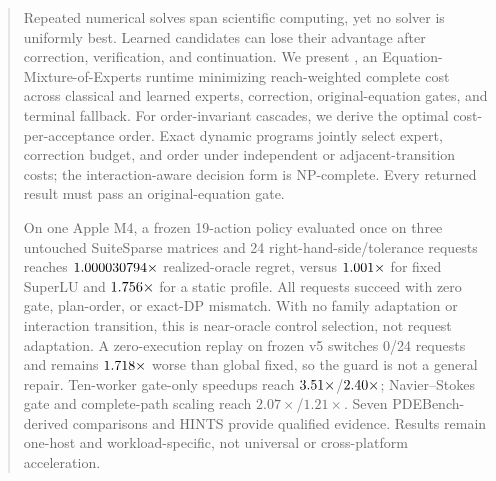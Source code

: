 \begin{abstract}
Repeated numerical solves span scientific computing, yet no solver is uniformly
best. Learned candidates can lose their advantage after correction, verification,
and continuation. We present \system, an
Equation-Mixture-of-Experts runtime minimizing reach-weighted complete cost across
classical and learned experts, correction, original-equation gates, and terminal
fallback. For order-invariant cascades, we derive the optimal cost-per-acceptance
order. Exact dynamic programs jointly select expert, correction budget, and order
under independent or adjacent-transition costs; the interaction-aware decision form
is NP-complete. Every returned result must pass an original-equation gate.

On one Apple M4, a frozen 19-action policy evaluated once on three untouched
SuiteSparse matrices and 24 right-hand-side/tolerance requests reaches
$\SuiteRouteRegretPrecise\times$ realized-oracle regret, versus
$\SuiteRouteFixedRegret\times$ for fixed SuperLU and
$\SuiteRouteStaticRegret\times$ for a static profile. All requests succeed with zero
gate, plan-order, or exact-DP mismatch. With no family adaptation or interaction
transition, this is near-oracle control selection, not request adaptation. A
zero-execution replay on frozen v5 switches 0/24 requests and
remains $\SuiteRouteVFiveReplayVsFixed\times$ worse than global fixed, so the guard
is not a general repair. Ten-worker gate-only speedups reach
$\LinearGateTenShort\times$/$\NonlinearGateTenShort\times$; Navier--Stokes gate and
complete-path scaling reach $2.07\times$/$1.21\times$. Seven PDEBench-derived
comparisons and HINTS provide qualified evidence. Results remain
one-host and workload-specific, not universal or cross-platform acceleration.
\end{abstract}
